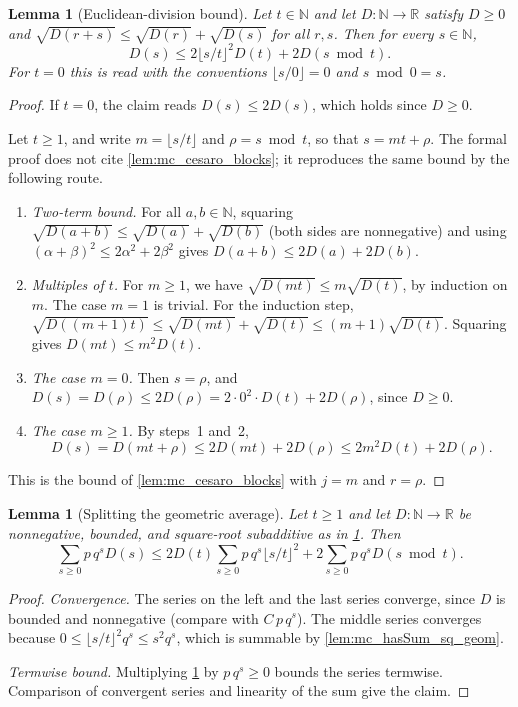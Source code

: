 \documentclass[11pt]{article}
\newtheorem{lemma}[theorem]{Lemma}
\theoremstyle{definition}
\theoremstyle{remark}
\newcommand{\R}{\mathbb{R}}
\newcommand{\N}{\mathbb{N}}
\begin{document}
\begin{lemma}[Euclidean-division bound]\label{lem:mc_D_divmod}
Let $t\in\N$ and let $D:\N\to\R$ satisfy $D\ge0$ and $\sqrt{D(r+s)}\le\sqrt{D(r)}+\sqrt{D(s)}$ for all $r,s$. Then for every $s\in\N$,
\[
D(s)\le2\lfloor s/t\rfloor^2D(t)+2D(s\bmod t).
\]
For $t=0$ this is read with the conventions $\lfloor s/0\rfloor=0$ and $s\bmod0=s$.
\end{lemma}
\begin{proof}
If $t=0$, the claim reads $D(s)\le2D(s)$, which holds since $D\ge0$.

Let $t\ge1$, and write $m=\lfloor s/t\rfloor$ and $\rho=s\bmod t$, so that $s=mt+\rho$. The formal proof does not cite \cref{lem:mc_cesaro_blocks}; it reproduces the same bound by the following route.
\begin{enumerate}
\item \emph{Two-term bound.} For all $a,b\in\N$, squaring $\sqrt{D(a+b)}\le\sqrt{D(a)}+\sqrt{D(b)}$ (both sides are nonnegative) and using $(\alpha+\beta)^2\le2\alpha^2+2\beta^2$ gives $D(a+b)\le2D(a)+2D(b)$.
\item \emph{Multiples of $t$.} For $m\ge1$, we have $\sqrt{D(mt)}\le m\sqrt{D(t)}$, by induction on $m$. The case $m=1$ is trivial. For the induction step, $\sqrt{D((m+1)t)}\le\sqrt{D(mt)}+\sqrt{D(t)}\le(m+1)\sqrt{D(t)}$. Squaring gives $D(mt)\le m^2D(t)$.
\item \emph{The case $m=0$.} Then $s=\rho$, and $D(s)=D(\rho)\le2D(\rho)=2\cdot0^2\cdot D(t)+2D(\rho)$, since $D\ge0$.
\item \emph{The case $m\ge1$.} By steps~1 and~2,
\[
D(s)=D(mt+\rho)\le2D(mt)+2D(\rho)\le2m^2D(t)+2D(\rho).
\]
\end{enumerate}
This is the bound of \cref{lem:mc_cesaro_blocks} with $j=m$ and $r=\rho$. \qedhere
\end{proof}

\begin{lemma}[Splitting the geometric average]\label{lem:mc_geom_cesaro_pre}
Let $t\ge1$ and let $D:\N\to\R$ be nonnegative, bounded, and square-root subadditive as in \cref{lem:mc_D_divmod}. Then
\[
\sum_{s\ge0}p\,q^sD(s)\le2D(t)\sum_{s\ge0}p\,q^s\lfloor s/t\rfloor^2+2\sum_{s\ge0}p\,q^sD(s\bmod t).
\]
\end{lemma}
\begin{proof}
\emph{Convergence.} The series on the left and the last series converge, since $D$ is bounded and nonnegative (compare with $C\,p\,q^s$). The middle series converges because $0\le\lfloor s/t\rfloor^2q^s\le s^2q^s$, which is summable by \cref{lem:mc_hasSum_sq_geom}.

\emph{Termwise bound.} Multiplying \cref{lem:mc_D_divmod} by $p\,q^s\ge0$ bounds the series termwise. Comparison of convergent series and linearity of the sum give the claim.
\end{proof}
\end{document}

